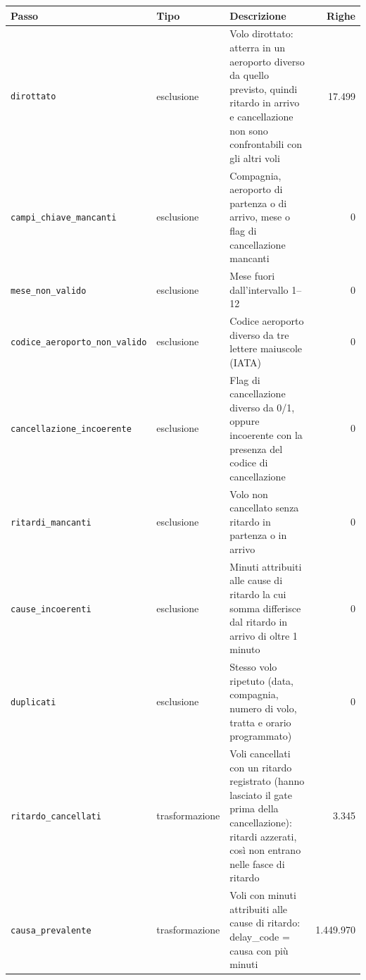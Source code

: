 \begin{tabularx}{\textwidth}{@{}l l X r@{}}
\toprule
Passo & Tipo & Descrizione & Righe \\
\midrule
\texttt{dirottato} & esclusione & Volo dirottato: atterra in un aeroporto diverso da quello previsto, quindi ritardo in arrivo e cancellazione non sono confrontabili con gli altri voli & 17.499 \\
\texttt{campi\_chiave\_mancanti} & esclusione & Compagnia, aeroporto di partenza o di arrivo, mese o flag di cancellazione mancanti & 0 \\
\texttt{mese\_non\_valido} & esclusione & Mese fuori dall'intervallo 1–12 & 0 \\
\texttt{codice\_aeroporto\_non\_valido} & esclusione & Codice aeroporto diverso da tre lettere maiuscole (IATA) & 0 \\
\texttt{cancellazione\_incoerente} & esclusione & Flag di cancellazione diverso da 0/1, oppure incoerente con la presenza del codice di cancellazione & 0 \\
\texttt{ritardi\_mancanti} & esclusione & Volo non cancellato senza ritardo in partenza o in arrivo & 0 \\
\texttt{cause\_incoerenti} & esclusione & Minuti attribuiti alle cause di ritardo la cui somma differisce dal ritardo in arrivo di oltre 1 minuto & 0 \\
\texttt{duplicati} & esclusione & Stesso volo ripetuto (data, compagnia, numero di volo, tratta e orario programmato) & 0 \\
\texttt{ritardo\_cancellati} & trasformazione & Voli cancellati con un ritardo registrato (hanno lasciato il gate prima della cancellazione): ritardi azzerati, così non entrano nelle fasce di ritardo & 3.345 \\
\texttt{causa\_prevalente} & trasformazione & Voli con minuti attribuiti alle cause di ritardo: delay\_code = causa con più minuti & 1.449.970 \\
\bottomrule
\end{tabularx}